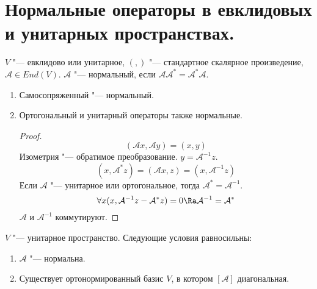 \section{Нормальные операторы в евклидовых и унитарных пространствах.}

\begin{Def}
	$V$ "--- евклидово или унитарное, $(,)$ "--- стандартное скалярное произведение, $\mathcal A \in End(V)$.
	$\mathcal A$ "--- нормальный, если $\mathcal A \mathcal{A}^* = \mathcal{A}^*\mathcal A$.
\end{Def}

\begin{exmp}\hfill
	\begin{enumerate}
		\item Самосопряженный "--- нормальный.
		\item Ортогональный и унитарный операторы также нормальные.
		\begin{proof}
			\[ (\mathcal Ax, \mathcal Ay) = (x, y) \]
			Изометрия "--- обратимое преобразование.
			$y = \mathcal{A}^{-1}z$.
			\[ (x, \mathcal{A}^*z) = (\mathcal Ax, z) = (x, \mathcal{A}^{-1}z) \]
			Если $\mathcal A$ "--- унитарное или ортогональное, тогда $\mathcal{A}^* = \mathcal{A}^{-1}$.
			\[ \forall x (x, \mathcal{A}^{-1}z - \mathcal{A}^*z) = 0 \Ra \mathcal{A}^{-1} = \mathcal{A}^* \]
			$\mathcal A$ и $\mathcal{A}^{-1}$ коммутируют.
		\end{proof}
	\end{enumerate}
\end{exmp}

\begin{theorem}
	$V$ "--- унитарное пространство.
	Следующие условия равносильны:
	\begin{enumerate}
		\item $\mathcal A$ "--- нормальна.
		\item Существует ортонормированный базис $V$, в котором $[\mathcal A]$ диагональная.
	\end{enumerate}
\end{theorem}

